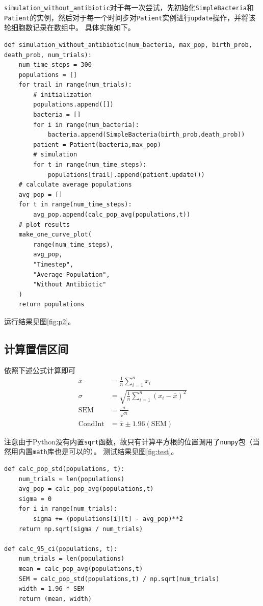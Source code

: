 \documentclass[logo,reportComp]{thesis}
\begin{document}
\verb'simulation_without_antibiotic'对于每一次尝试，先初始化\verb'SimpleBacteria'和\verb'Patient'的实例，然后对于每一个时间步对\verb'Patient'实例进行\verb'update'操作，并将该轮细胞数记录在数组中。
具体实施如下。
\begin{lstlisting}
def simulation_without_antibiotic(num_bacteria, max_pop, birth_prob, death_prob, num_trials):
    num_time_steps = 300
    populations = []
    for trail in range(num_trials):
        # initialization
        populations.append([])
        bacteria = []
        for i in range(num_bacteria):
            bacteria.append(SimpleBacteria(birth_prob,death_prob))
        patient = Patient(bacteria,max_pop)
        # simulation
        for t in range(num_time_steps):
            populations[trail].append(patient.update())
    # calculate average populations
    avg_pop = []
    for t in range(num_time_steps):
        avg_pop.append(calc_pop_avg(populations,t))
    # plot results
    make_one_curve_plot(
        range(num_time_steps),
        avg_pop,
        "Timestep",
        "Average Population",
        "Without Antibiotic"
    )
    return populations
\end{lstlisting}

运行结果见图\ref{fig:p2}。

\subsection{计算置信区间}
依照下述公式计算即可
\[\begin{aligned}
\bar{x}&=\frac{1}{n}\sum_{i=1}^nx_i\\
\sigma&=\sqrt{\frac{1}{n}\sum_{i=1}^n(x_i-\bar{x})^2}\\
\text{SEM}&=\frac{\sigma}{\sqrt{n}}\\
\text{CondInt}&=\bar{x}\pm 1.96(\text{SEM})
\end{aligned}\]

注意由于Python没有内置\verb'sqrt'函数，故只有计算平方根的位置调用了\verb'numpy'包（当然用内置\verb'math'库也是可以的）。
测试结果见图\ref{fig:test}。
\begin{lstlisting}
def calc_pop_std(populations, t):
    num_trials = len(populations)
    avg_pop = calc_pop_avg(populations,t)
    sigma = 0
    for i in range(num_trials):
        sigma += (populations[i][t] - avg_pop)**2
    return np.sqrt(sigma / num_trials)

def calc_95_ci(populations, t):
    num_trials = len(populations)
    mean = calc_pop_avg(populations,t)
    SEM = calc_pop_std(populations,t) / np.sqrt(num_trials)
    width = 1.96 * SEM
    return (mean, width)
\end{lstlisting}
\end{document}
